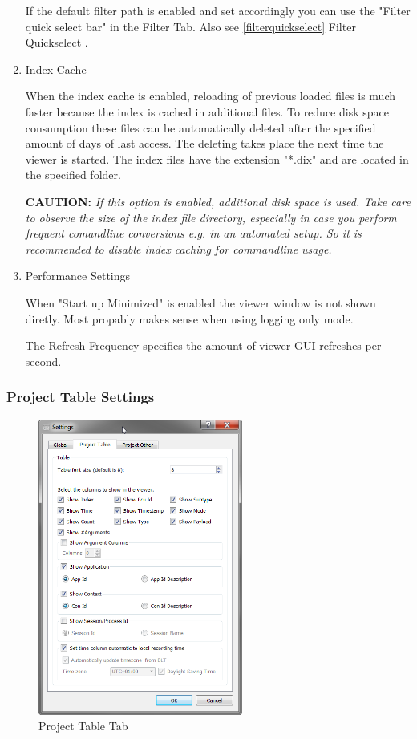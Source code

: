 \documentclass[a4paper,11pt]{article}
\newcommand{\caution}[1]{\begin{ibox} \textbf{CAUTION:} \emph{#1} \end{ibox}}
\begin{document}
\begin{enumerate}
\label{defaultfilterpath}
If the default filter path is enabled and set accordingly you can use the "Filter quick select bar" in the Filter Tab.
Also see \autoref{filterquickselect}{ Filter Quickselect }.
\nopagebreak

\item{Index Cache}

When the index cache is enabled, reloading of previous loaded files is much faster because the index is cached in additional files.
To reduce disk space consumption these files can be automatically deleted after the specified amount of days of last access.
The deleting takes place the next time the viewer is started. The index files have the extension "*.dix" and are located in the specified folder.
\caution{If this option is enabled, additional disk space is used. Take care to observe the size of the index file directory, especially in case you perform 
         frequent comandline conversions e.g. in an automated setup. So it is recommended to disable index caching for commandline usage. }

\item{Performance Settings}

When "Start up Minimized" is enabled the viewer window is not shown diretly. Most propably makes sense when using logging only mode.

The Refresh Frequency specifies the amount of viewer GUI refreshes per second.
\end{enumerate}


\subsubsection{Project Table Settings}

\begin{figure}[H]
 \centering
 \includegraphics[width=0.6\textwidth]{images/settings_projecttable.png}
 \caption{Project Table Tab}
 \label{fig:projecttabletab}
\end{figure}
\end{document}
